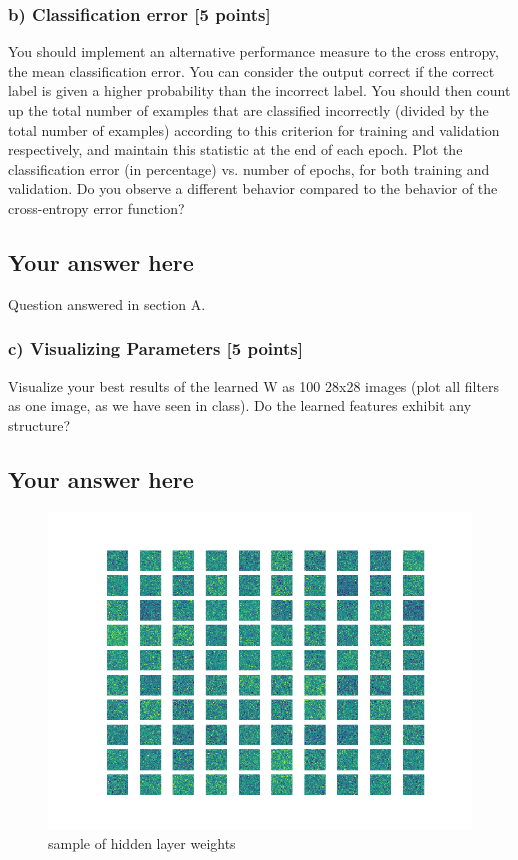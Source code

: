 \documentclass{article}
\begin{document}
\subsubsection*{b) Classification error [5 points]}

You should implement an alternative performance measure to the cross entropy, the mean
classification error. You can
consider the output correct if the correct label is given a higher probability
than the incorrect label. You should then count up the total number of
examples that are classified incorrectly (divided by the total number of examples) 
according to this criterion for
training and validation respectively, and maintain this statistic at the end of
each epoch. Plot the classification error (in percentage)  vs. number of epochs, for both
training and validation.
Do you observe a different behavior compared to the behavior of the cross-entropy 
error function? 

\subsection*{Your answer here}
Question answered in section A.

\subsubsection*{c) Visualizing Parameters [5 points]}
Visualize your best results of the learned W as 100 28x28 images 
(plot all filters as one image, as we have seen in class). 
Do the learned features exhibit any structure?

\subsection*{Your answer here}

\begin{figure}[h]
\centering
\includegraphics[width=.7\linewidth]{q6c.png}
\caption{sample of hidden layer weights}
\label{fig:weights}
\end{figure}
\end{document}
